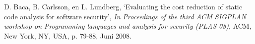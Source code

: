 \begin{thebibliography}

  D. Baca, B. Carlsson, en L. Lundberg,
  `Evaluating the cost reduction of static code analysis for software security',
  \emph{In Proceedings of the third ACM SIGPLAN workshop on Programming languages and analysis for security (PLAS \'08)},
  ACM, New York, NY, USA, p. 79-88,
  Juni 2008.

\end{thebibliography}